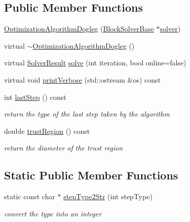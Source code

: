 \subsection*{Public Member Functions}
\begin{DoxyCompactItemize}
\item 
\hyperlink{classg2o_1_1OptimizationAlgorithmDogleg_ab332f8fb049d1a1fecba18105083052a}{Optimization\+Algorithm\+Dogleg} (\hyperlink{classg2o_1_1BlockSolverBase}{Block\+Solver\+Base} $\ast$\hyperlink{classg2o_1_1OptimizationAlgorithmWithHessian_a85473a4073c76b1a52cf9cf175e31c45}{solver})
\item 
virtual \hyperlink{classg2o_1_1OptimizationAlgorithmDogleg_ac5ebd46eeca170f6a923c75556504d2b}{$\sim$\+Optimization\+Algorithm\+Dogleg} ()
\item 
virtual \hyperlink{classg2o_1_1OptimizationAlgorithm_a705d58d7bc19528a8ab718570d090cdf}{Solver\+Result} \hyperlink{classg2o_1_1OptimizationAlgorithmDogleg_ace62fd809c18655bd7ff104285748610}{solve} (int iteration, bool online=false)
\item 
virtual void \hyperlink{classg2o_1_1OptimizationAlgorithmDogleg_a9bed238c5d36c094ca10103bb1c3979e}{print\+Verbose} (std\+::ostream \&os) const 
\item 
int \hyperlink{classg2o_1_1OptimizationAlgorithmDogleg_a53a17375bcc00da1e56ad6582dff5d7b}{last\+Step} () const 
\begin{DoxyCompactList}\small\item\em return the type of the last step taken by the algorithm \end{DoxyCompactList}\item 
double \hyperlink{classg2o_1_1OptimizationAlgorithmDogleg_a6cf67489a9b88d02ab74d6125df35f4b}{trust\+Region} () const 
\begin{DoxyCompactList}\small\item\em return the diameter of the trust region \end{DoxyCompactList}\end{DoxyCompactItemize}
\subsection*{Static Public Member Functions}
\begin{DoxyCompactItemize}
\item 
static const char $\ast$ \hyperlink{classg2o_1_1OptimizationAlgorithmDogleg_a65f193c6451ffcd2bd6fd8f8d19e2a12}{step\+Type2\+Str} (int step\+Type)
\begin{DoxyCompactList}\small\item\em convert the type into an integer \end{DoxyCompactList}\end{DoxyCompactItemize}
